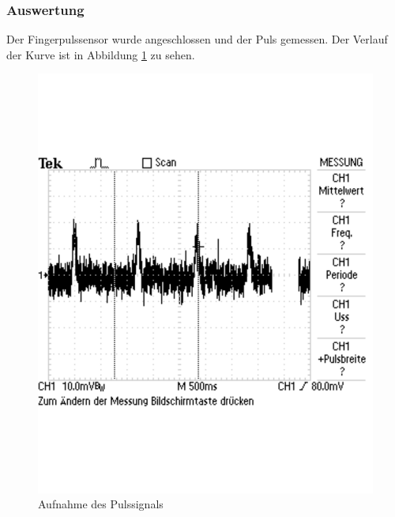 \documentclass[12pt,a4paper]{article}
\begin{document}
\subsubsection*{Auswertung}

Der Fingerpulssensor wurde angeschlossen und der Puls gemessen. Der Verlauf der Kurve ist in Abbildung \ref{fig:erster_puls} zu sehen.

\begin{figure}[H] 
	\centering
	\includegraphics[trim = 0mm 50mm 0mm 50mm, clip, scale = 0.5]{a1.pdf}
	\caption[Aufnahme des Pulssignals]{Aufnahme des Pulssignals}
	\label{fig:erster_puls}
\end{figure}
\end{document}
